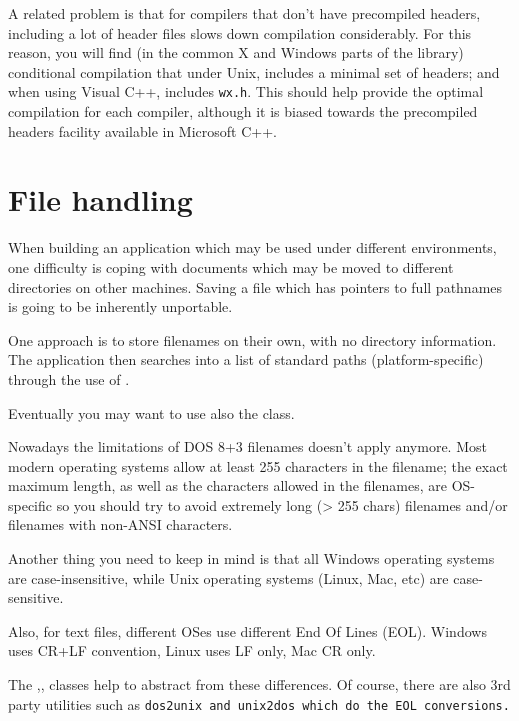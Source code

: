 A related problem is that for compilers that don't have precompiled
headers, including a lot of header files slows down compilation
considerably. For this reason, you will find (in the common
X and Windows parts of the library) conditional
compilation that under Unix, includes a minimal set of headers;
and when using Visual C++, includes {\tt wx.h}. This should help provide
the optimal compilation for each compiler, although it is
biased towards the precompiled headers facility available
in Microsoft C++.

\section{File handling}\label{filehandling}

When building an application which may be used under different
environments, one difficulty is coping with documents which may be
moved to different directories on other machines. Saving a file which
has pointers to full pathnames is going to be inherently unportable.

One approach is to store filenames on their own, with no directory
information. The application then searches into a list of standard
paths (platform-specific) through the use of .

Eventually you may want to use also the  class.

Nowadays the limitations of DOS 8+3 filenames doesn't apply anymore.
Most modern operating systems allow at least 255 characters in the filename;
the exact maximum length, as well as the characters allowed in the filenames, 
are OS-specific so you should try to avoid extremely long (> 255 chars) filenames
and/or filenames with non-ANSI characters.

Another thing you need to keep in mind is that all Windows operating systems
are case-insensitive, while Unix operating systems (Linux, Mac, etc) are
case-sensitive.

Also, for text files, different OSes use different End Of Lines (EOL).
Windows uses CR+LF convention, Linux uses LF only, Mac CR only.

The ,,
 classes help to abstract
from these differences.
Of course, there are also 3rd party utilities such as \tt{dos2unix} and \tt{unix2dos}
which do the EOL conversions.


